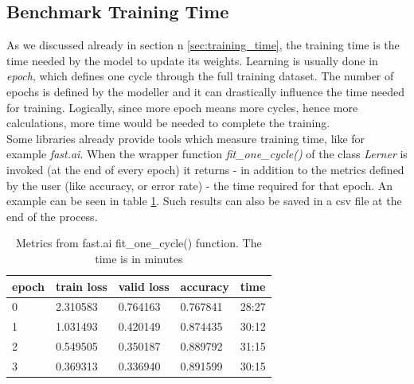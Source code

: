 \subsection{Benchmark Training Time}\label{b_trainig_time}
As we discussed already in section n \ref{sec:training_time}, the training time is the time needed by the model to update its weights. Learning is usually done in \textit{epoch}, which defines one cycle through the full training dataset. \cite{Afaq2020SignificanceOE} The number of epochs is defined by the modeller and it can drastically influence the time needed for training. Logically, since more epoch means more cycles, hence more calculations, more time would be needed to complete the training.\\
Some libraries already provide tools which measure training time, like for example \textit{fast.ai}. When the wrapper function \textit{fit\_one\_cycle()} of the class \textit{Lerner} is invoked (at the end of every epoch) it returns - in addition to the metrics defined by the user (like accuracy, or error rate) - the time required for that epoch. An example can be seen in table \ref{tab:m_fast}. Such results can also be saved in a csv file at the end of the process. \\
\begin{table}[h]
\centering
\begin{tabular}{ p{1cm} p{2cm} p{2cm} p{2cm} p{2cm}   }
 epoch&train loss &valid loss & accuracy &time\\
 \hline
0	&2.310583	&0.764163	&0.767841	&28:27\\
1	&1.031493	&0.420149	&0.874435	&30:12\\
2	&0.549505	&0.350187	&0.889792	&31:15\\
3	&0.369313	&0.336940	&0.891599	&30:15\\

 \hline
\end{tabular}
\caption[Metrics from fast.ai fit\_one\_cycle() function]{Metrics from fast.ai fit\_one\_cycle() function. The time is in minutes}
\label{tab:m_fast}
\end{table}


